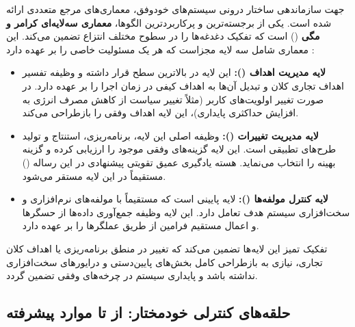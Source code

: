 \documentclass[oneside,openany,phd]{TMU-Thesis}
\begin{document}
جهت سازماندهی ساختار درونی سیستم‌های خودوفق، معماری‌های مرجع متعددی ارائه شده است. یکی از برجسته‌ترین و پرکاربردترین الگوها، \textbf{معماری سه‌لایه‌ای کرامر و مگی} () است که تفکیک دغدغه‌ها را در سطوح مختلف انتزاع تضمین می‌کند. این معماری شامل سه لایه مجزاست که هر یک مسئولیت خاصی را بر عهده دارد \cite{kramer2007self}:
\begin{itemize}
    \item \textbf{لایه مدیریت اهداف ():} این لایه در بالاترین سطح قرار داشته و وظیفه تفسیر اهداف تجاری کلان و تبدیل آن‌ها به اهداف کیفی در زمان اجرا را بر عهده دارد. در صورت تغییر اولویت‌های کاربر (مثلاً تغییر سیاست از کاهش مصرف انرژی به افزایش حداکثری پایداری)، این لایه اهداف وفقی را بازطراحی می‌کند.
    \item \textbf{لایه مدیریت تغییرات ():} وظیفه اصلی این لایه، برنامه‌ریزی، استنتاج و تولید طرح‌های تطبیقی است. این لایه گزینه‌های وفقی موجود را ارزیابی کرده و گزینه بهینه را انتخاب می‌نماید. هسته یادگیری عمیق تقویتی پیشنهادی در این رساله () مستقیماً در این لایه مستقر می‌شود.
    \item \textbf{لایه کنترل مولفه‌ها ():} لایه پایینی است که مستقیماً با مولفه‌های نرم‌افزاری و سخت‌افزاری سیستم هدف تعامل دارد. این لایه وظیفه جمع‌آوری داده‌ها از حسگرها و اعمال مستقیم فرامین از طریق عملگرها را بر عهده دارد.
\end{itemize}

تفکیک تمیز این لایه‌ها تضمین می‌کند که تغییر در منطق برنامه‌ریزی یا اهداف کلان تجاری، نیازی به بازطراحی کامل بخش‌های پایین‌دستی و درایورهای سخت‌افزاری نداشته باشد و پایداری سیستم در چرخه‌های وفقی تضمین گردد.

\subsection{حلقه‌های کنترلی خودمختار: از  تا موارد پیشرفته}
\end{document}

